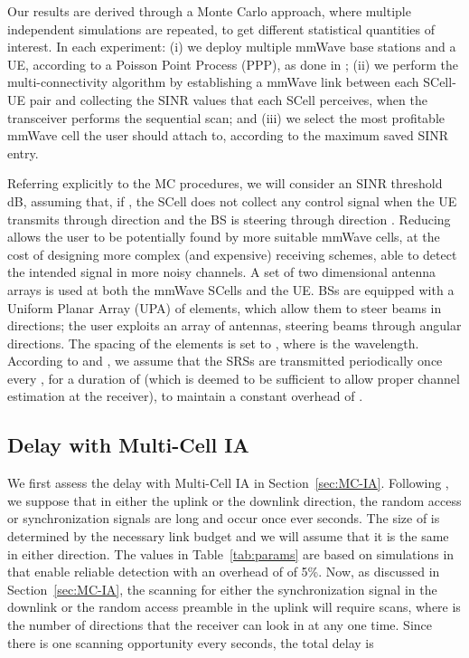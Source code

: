 \documentclass[conference,a4paper]{IEEEtran}
\begin{document}
Our results are derived through a Monte Carlo approach, where multiple independent simulations are repeated, to  get different statistical quantities of interest. In each experiment: (i) we deploy multiple mmWave base stations and a UE, according to a Poisson Point Process (PPP), as done in \cite{Heath}; (ii) we perform the multi-connectivity algorithm by establishing a mmWave link between each SCell-UE pair and collecting the SINR values that each SCell perceives, when the transceiver performs the sequential scan; and (iii) we select the most profitable mmWave cell the user should attach to, according to the maximum saved SINR entry.



Referring explicitly to the MC procedures, we will consider an SINR threshold  dB, assuming that, if ,  the SCell does not collect any control signal when the UE  transmits through direction   and the BS  is steering through direction . 
Reducing   allows the user to be potentially found by more suitable mmWave cells, at the cost of designing more complex (and expensive) receiving schemes, able to detect the intended signal in more noisy channels. A set of two dimensional antenna arrays is used at both the mmWave SCells and the UE. BSs are equipped with a Uniform Planar Array (UPA) of  elements, which allow them to steer beams in  directions; the user exploits an array of  antennas, steering beams through  angular directions. The spacing of the elements is set to , where  is the wavelength.  
According to \cite{Barati} and \cite{CISS}, we assume that the SRSs  are transmitted periodically once every , for a duration of  (which is deemed to be sufficient to allow proper channel estimation at the receiver), to maintain a constant overhead of .







\subsection{Delay with Multi-Cell IA}
\label{sec:delay}

We first assess the delay with Multi-Cell IA in Section~\ref{sec:MC-IA}.
Following \cite{Barati,barati2015initial},
we suppose that in either the uplink or the downlink
direction, the random access or synchronization signals are  long
and occur once ever  seconds.  The size of  is
determined by the necessary link budget and we will assume that it is the same in either
direction.  The values in Table~\ref{tab:params} are based on simulations in 
\cite{barati2015initial} that enable reliable detection with an overhead of 
of 5\%.  Now, as discussed in Section~\ref{sec:MC-IA}, the scanning for either the synchronization 
signal in the downlink or the random access preamble in the uplink will require
 scans, where  is the number of directions that the 
receiver can look in at any one time.  Since there is one scanning opportunity every 
seconds, the total delay is
\end{document}
